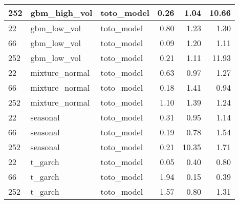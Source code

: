 {\begin{tabular}{lllrrr}
252 & gbm\_high\_vol & toto\_model & 0.26 & 1.04 & 10.66 \\
\midrule
22 & gbm\_low\_vol & toto\_model & 0.80 & 1.23 & 1.30 \\
66 & gbm\_low\_vol & toto\_model & 0.09 & 1.20 & 1.11 \\
252 & gbm\_low\_vol & toto\_model & 0.21 & 1.11 & 11.93 \\
\midrule
22 & mixture\_normal & toto\_model & 0.63 & 0.97 & 1.27 \\
66 & mixture\_normal & toto\_model & 0.18 & 1.41 & 0.94 \\
252 & mixture\_normal & toto\_model & 1.10 & 1.39 & 1.24 \\
\midrule
22 & seasonal & toto\_model & 0.31 & 0.95 & 1.14 \\
66 & seasonal & toto\_model & 0.19 & 0.78 & 1.54 \\
252 & seasonal & toto\_model & 0.21 & 10.35 & 1.71 \\
\midrule
22 & t\_garch & toto\_model & 0.05 & 0.40 & 0.80 \\
66 & t\_garch & toto\_model & 1.94 & 0.15 & 0.39 \\
252 & t\_garch & toto\_model & 1.57 & 0.80 & 1.31 \\
\bottomrule
\end{tabular}
}